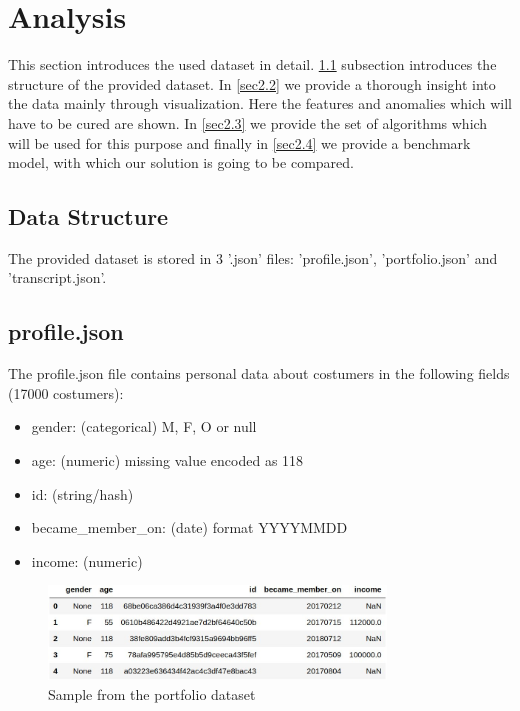 \section{Analysis}

This section introduces the used dataset in detail. \ref{sec2.1} subsection introduces the structure of the provided dataset. In \ref{sec2.2} we provide a thorough insight into the data mainly through visualization. Here the features and anomalies which will have to be cured are shown. In \ref{sec2.3} we provide the set of algorithms which will be used for this purpose and finally in \ref{sec2.4} we provide a benchmark model, with which our solution is going to be compared.

\subsection{Data Structure}\label{sec2.1}

The provided dataset is stored in 3 '.json' files: 'profile.json', 'portfolio.json' and 'transcript.json'. 
\subsection*{profile.json}
The profile.json file contains personal data about costumers in the following fields (17000 costumers):
\begin{itemize}
	\item gender: (categorical) M, F, O or null
	\item age: (numeric) missing value encoded as 118
	\item id: (string/hash)
	\item became\_member\_on: (date) format YYYYMMDD
	\item income: (numeric)
\end{itemize}

\begin{figure}[h]
	\centering
	\includegraphics[width=0.8\textwidth]{fig/profile_head.jpg}
	\vspace*{-0.1in}
	\caption{Sample from the portfolio dataset}
	\label{fig1}
	\vspace*{-0.2in}
	\bigskip
\end{figure}

